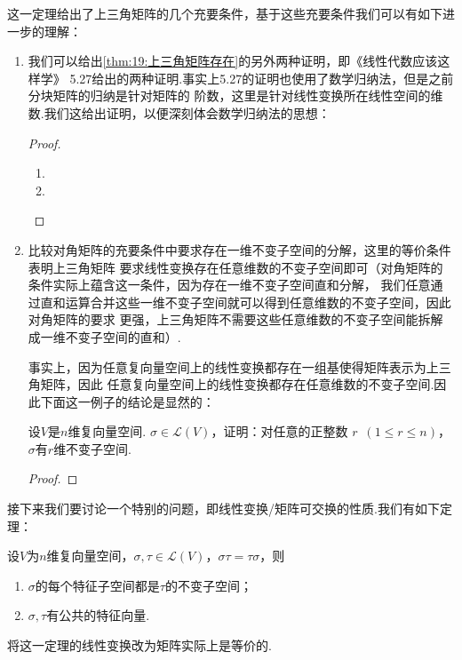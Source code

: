 这一定理给出了上三角矩阵的几个充要条件，基于这些充要条件我们可以有如下进一步的理解：
\begin{enumerate}
    \item 我们可以给出\autoref{thm:19:上三角矩阵存在}的另外两种证明，即《线性代数应该这样学》
    5.27给出的两种证明.事实上5.27的证明也使用了数学归纳法，但是之前分块矩阵的归纳是针对矩阵的
    阶数，这里是针对线性变换所在线性空间的维数.我们这给出证明，以便深刻体会数学归纳法的思想：
    
    \begin{proof}
        \begin{enumerate}
            \item 
            \item 
        \end{enumerate}
    \end{proof}
    
    \item 比较对角矩阵的充要条件中要求存在一维不变子空间的分解，这里的等价条件表明上三角矩阵
    要求线性变换存在任意维数的不变子空间即可（对角矩阵的条件实际上蕴含这一条件，因为存在一维不变子空间直和分解，
    我们任意通过直和运算合并这些一维不变子空间就可以得到任意维数的不变子空间，因此对角矩阵的要求
    更强，上三角矩阵不需要这些任意维数的不变子空间能拆解成一维不变子空间的直和）.
    
    事实上，因为任意复向量空间上的线性变换都存在一组基使得矩阵表示为上三角矩阵，因此
    任意复向量空间上的线性变换都存在任意维数的不变子空间.因此下面这一例子的结论是显然的：
    \begin{example}
        设$V$是$n$维复向量空间. $\sigma\in \mathcal{L}(V)$，证明：对任意的正整数
        $r\enspace(1\leqslant r\leqslant n)$，$\sigma$有$r$维不变子空间.
    \end{example}
    \begin{proof}
        
    \end{proof}
\end{enumerate}

接下来我们要讨论一个特别的问题，即线性变换/矩阵可交换的性质.我们有如下定理：
\begin{theorem}
    设$V$为$n$维复向量空间，$\sigma,\tau\in \mathcal{L}(V)$，$\sigma\tau=\tau\sigma$，则
    \begin{enumerate}[label=(\arabic*)]
        \item $\sigma$的每个特征子空间都是$\tau$的不变子空间；

        \item $\sigma,\tau$有公共的特征向量.
    \end{enumerate}
\end{theorem}
将这一定理的线性变换改为矩阵实际上是等价的.

